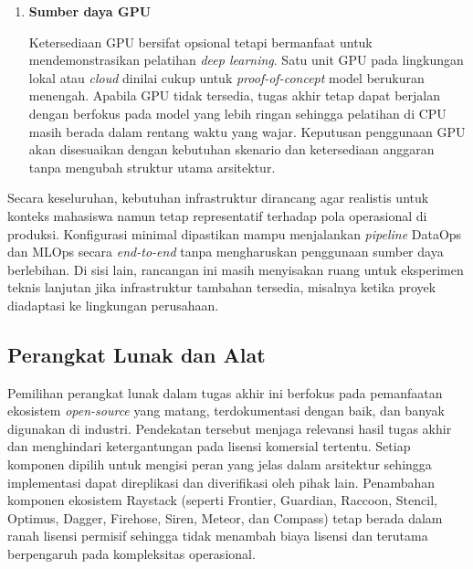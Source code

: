 \begin{enumerate}
    \vspace{0.5em}
    
    \item \textbf{Sumber daya GPU}
    
    Ketersediaan GPU bersifat opsional tetapi bermanfaat untuk mendemonstrasikan pelatihan \textit{deep learning}. Satu unit GPU pada lingkungan lokal atau \textit{cloud} dinilai cukup untuk \textit{proof-of-concept} model berukuran menengah. Apabila GPU tidak tersedia, tugas akhir tetap dapat berjalan dengan berfokus pada model yang lebih ringan sehingga pelatihan di CPU masih berada dalam rentang waktu yang wajar. Keputusan penggunaan GPU akan disesuaikan dengan kebutuhan skenario dan ketersediaan anggaran tanpa mengubah struktur utama arsitektur.
    
    \vspace{0.5em}
\end{enumerate}

Secara keseluruhan, kebutuhan infrastruktur dirancang agar realistis untuk konteks mahasiswa namun tetap representatif terhadap pola operasional di produksi. Konfigurasi minimal dipastikan mampu menjalankan \textit{pipeline} DataOps dan MLOps secara \textit{end-to-end} tanpa mengharuskan penggunaan sumber daya berlebihan. Di sisi lain, rancangan ini masih menyisakan ruang untuk eksperimen teknis lanjutan jika infrastruktur tambahan tersedia, misalnya ketika proyek diadaptasi ke lingkungan perusahaan.

\subsection{Perangkat Lunak dan Alat}

Pemilihan perangkat lunak dalam tugas akhir ini berfokus pada pemanfaatan ekosistem \textit{open-source} yang matang, terdokumentasi dengan baik, dan banyak digunakan di industri. Pendekatan tersebut menjaga relevansi hasil tugas akhir dan menghindari ketergantungan pada lisensi komersial tertentu. Setiap komponen dipilih untuk mengisi peran yang jelas dalam arsitektur sehingga implementasi dapat direplikasi dan diverifikasi oleh pihak lain. Penambahan komponen ekosistem Raystack (seperti Frontier, Guardian, Raccoon, Stencil, Optimus, Dagger, Firehose, Siren, Meteor, dan Compass) tetap berada dalam ranah lisensi permisif sehingga tidak menambah biaya lisensi dan terutama berpengaruh pada kompleksitas operasional.

\vspace{0.5em}

